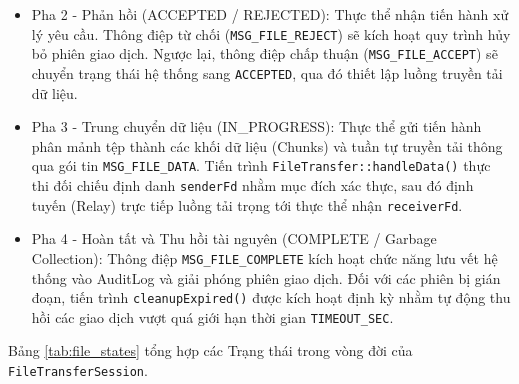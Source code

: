 \begin{enumerate}
\begin{itemize}[label={-}]
        \item Pha 2 - Phản hồi (ACCEPTED / REJECTED): Thực thể nhận tiến hành xử lý yêu cầu. Thông điệp từ chối (\texttt{MSG\_FILE\_REJECT}) sẽ kích hoạt quy trình hủy bỏ phiên giao dịch. Ngược lại, thông điệp chấp thuận (\texttt{MSG\_FILE\_ACCEPT}) sẽ chuyển trạng thái hệ thống sang \texttt{ACCEPTED}, qua đó thiết lập luồng truyền tải dữ liệu.
        
        \item Pha 3 - Trung chuyển dữ liệu (IN\_PROGRESS): Thực thể gửi tiến hành phân mảnh tệp thành các khối dữ liệu (Chunks) và tuần tự truyền tải thông qua gói tin \texttt{MSG\_FILE\_DATA}. Tiến trình \texttt{FileTransfer::handleData()} thực thi đối chiếu định danh \texttt{senderFd} nhằm mục đích xác thực, sau đó định tuyến (Relay) trực tiếp luồng tải trọng tới thực thể nhận \texttt{receiverFd}.
        
        \item Pha 4 - Hoàn tất và Thu hồi tài nguyên (COMPLETE / Garbage Collection): Thông điệp \texttt{MSG\_FILE\_COMPLETE} kích hoạt chức năng lưu vết hệ thống vào AuditLog và giải phóng phiên giao dịch. Đối với các phiên bị gián đoạn, tiến trình \texttt{cleanupExpired()} được kích hoạt định kỳ nhằm tự động thu hồi các giao dịch vượt quá giới hạn thời gian \texttt{TIMEOUT\_SEC}.
    \end{itemize}
\end{enumerate}

Bảng \ref{tab:file_states} tổng hợp các Trạng thái trong vòng đời của \texttt{FileTransferSession}.

